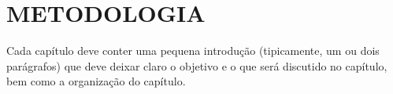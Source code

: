 
\chapter{METODOLOGIA}
\label{chap:metodologia}
Cada capítulo deve conter uma pequena introdução (tipicamente, um ou dois parágrafos) que deve deixar claro o objetivo e o que será discutido no capítulo, bem como a organização do capítulo.
